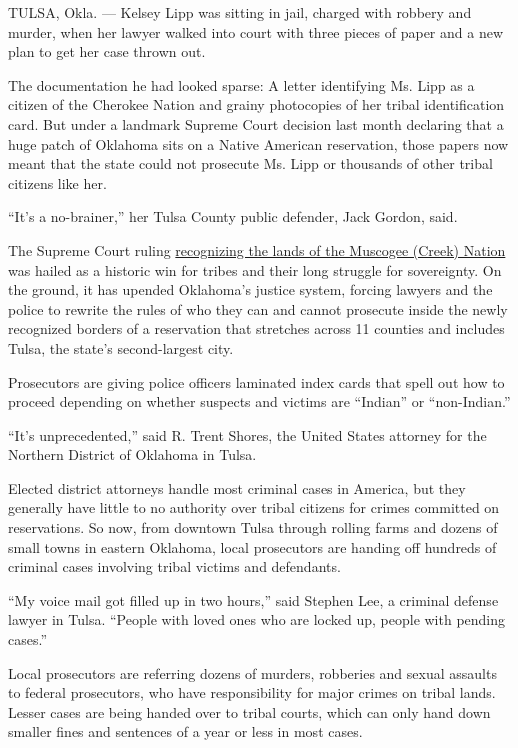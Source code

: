 TULSA, Okla. --- Kelsey Lipp was sitting in jail, charged with robbery
and murder, when her lawyer walked into court with three pieces of paper
and a new plan to get her case thrown out.

The documentation he had looked sparse: A letter identifying Ms. Lipp as
a citizen of the Cherokee Nation and grainy photocopies of her tribal
identification card. But under a landmark Supreme Court decision last
month declaring that a huge patch of Oklahoma sits on a Native American
reservation, those papers now meant that the state could not prosecute
Ms. Lipp or thousands of other tribal citizens like her.

``It's a no-brainer,'' her Tulsa County public defender, Jack Gordon,
said.

The Supreme Court ruling
\href{https://www.nytimes.com/2020/07/09/us/supreme-court-oklahoma-mcgirt-creek-nation.html}{recognizing
the lands of the Muscogee (Creek) Nation} was hailed as a historic win
for tribes and their long struggle for sovereignty. On the ground, it
has upended Oklahoma's justice system, forcing lawyers and the police to
rewrite the rules of who they can and cannot prosecute inside the newly
recognized borders of a reservation that stretches across 11 counties
and includes Tulsa, the state's second-largest city.

Prosecutors are giving police officers laminated index cards that spell
out how to proceed depending on whether suspects and victims are
``Indian'' or ``non-Indian.''

``It's unprecedented,'' said R. Trent Shores, the United States attorney
for the Northern District of Oklahoma in Tulsa.

Elected district attorneys handle most criminal cases in America, but
they generally have little to no authority over tribal citizens for
crimes committed on reservations. So now, from downtown Tulsa through
rolling farms and dozens of small towns in eastern Oklahoma, local
prosecutors are handing off hundreds of criminal cases involving tribal
victims and defendants.

``My voice mail got filled up in two hours,'' said Stephen Lee, a
criminal defense lawyer in Tulsa. ``People with loved ones who are
locked up, people with pending cases.''

Local prosecutors are referring dozens of murders, robberies and sexual
assaults to federal prosecutors, who have responsibility for major
crimes on tribal lands. Lesser cases are being handed over to tribal
courts, which can only hand down smaller fines and sentences of a year
or less in most cases.

